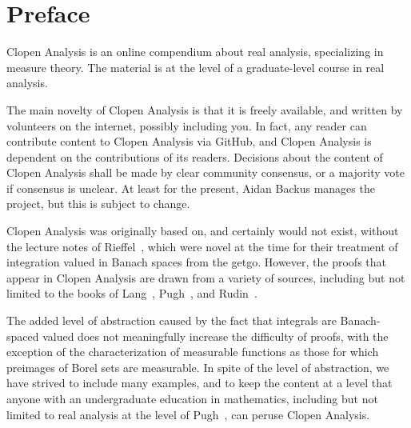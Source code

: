\chapter*{Preface}
Clopen Analysis is an online compendium about real analysis, specializing in measure theory.
The material is at the level of a graduate-level course in real analysis.

The main novelty of Clopen Analysis is that it is freely available, and written by volunteers on the internet, possibly including you.
In fact, any reader can contribute content to Clopen Analysis via GitHub, and Clopen Analysis is dependent on the contributions of its readers.
Decisions about the content of Clopen Analysis shall be made by clear community consensus, or a majority vote if consensus is unclear.
At least for the present, Aidan Backus manages the project, but this is subject to change.

Clopen Analysis was originally based on, and certainly would not exist, without the lecture notes of Rieffel~\cite{Rieffel1970}, which were novel at the time for their treatment of integration valued in Banach spaces from the getgo.
However, the proofs that appear in Clopen Analysis are drawn from a variety of sources, including but not limited to the books of Lang~\cite{lang2012real}, Pugh~\cite{pugh2013real}, and Rudin~\cite{rudin1978real}.

The added level of abstraction caused by the fact that integrals are Banach-spaced valued does not meaningfully increase the difficulty of proofs, with the exception of the characterization of measurable functions as those for which preimages of Borel sets are measurable.
In spite of the level of abstraction, we have strived to include many examples, and to keep the content at a level that anyone with an undergraduate education in mathematics, including but not limited to real analysis at the level of Pugh~\cite{pugh2013real}, can peruse Clopen Analysis.
